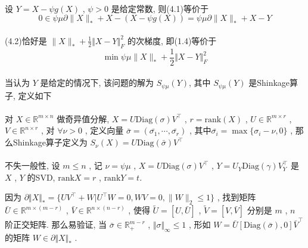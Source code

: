 \documentclass[UTF8]{ctexart}
\newcommand{\norm}[1]{\lVert#1\rVert}
\newcommand{\Real}[1]{\mathbb{R}^{#1}}
\newcommand{\nunorm}{\norm{X}_*}
\numberwithin{equation}{section}
\begin{document}
		\paragraph{}\quad 设 $Y = X - \psi g(X)$ , $\psi > 0$ 是给定常数, 则(4.1)等价于
			\begin{equation}
				0 \in \psi \mu \partial \nunorm + X - (X - \psi g(X)) = \psi \mu \partial \nunorm + X -Y
			\end{equation}

		\paragraph{}\quad (4.2)恰好是 $\nunorm + \frac{1}{2} \Vert{X - Y}\Vert^2_F$ 的次梯度, 即(1.4)等价于 
			\begin{equation}
				\min \psi \mu \nunorm + \frac{1}{2} \Vert{X - Y}\Vert^2_F
			\end{equation}
		\paragraph{}\quad 当认为 $Y$ 是给定的情况下, 该问题的解为 $S_{\psi \mu}(Y)$, 其中 $S_{\psi \mu}(Y)$ 是Shinkage算子, 定义如下
		
		\paragraph{}\quad 对 $X \in \Real{m \times n}$ 做奇异值分解, $X = U \text{Diag}(\sigma) V ^\top$ , $r = \text{rank}(X)$ , $U \in \Real{m \times r}$ , $V \in \Real{n \times r}$ , 对 $\forall \nu > 0$ , 定义向量 $\bar{\sigma} = (\bar{\sigma_1}, \cdots, \bar{\sigma_r})$ , 其中$\bar{\sigma_i} = \max \{\sigma_i - \nu, 0\}$ , 那么Shinkage算子定义为 $S_\nu(X) = U \text{Diag}(\bar{\sigma}) V ^\top$

		\paragraph{}\quad 不失一般性, 设 $m \le n$ , 记 $\nu = \psi \mu$ , $X = U \text{Diag}(\sigma) V ^\top$ , $Y = U_Y \text{Diag}(\gamma) V_Y ^\top$ 是 $X$ , $Y$ 的SVD, $\text{rank} X = r$ , $\text{rank} Y = t$.
		
		因为 $\partial \Vert{X}\Vert_* = \{UV^\top+W\vert U^\top W=0,WV=0,\norm{W}_2\leq1\}$ , 找到矩阵 $\bar{U} \in \Real{m \times (m - r)}$ , $\bar{V} \in \Real{n \times (n - r)}$ , 使得 $\tilde{U} = [U, \bar{U}]$ , $\tilde{V} = [V, \bar{V}]$ 分别是 $m$ , $n$ 阶正交矩阵. 那么易验证, 当 $\bar{\sigma} \in \Real{m-r}_+$ , $\Vert{\sigma}\Vert_\infty \le 1$ , 形如 $W = \bar{U}[\text{Diag}(\bar{\sigma}), 0]\bar{V} ^\top$ 的矩阵 $W \in \partial \Vert{X}\Vert_*$ .
\end{document}
